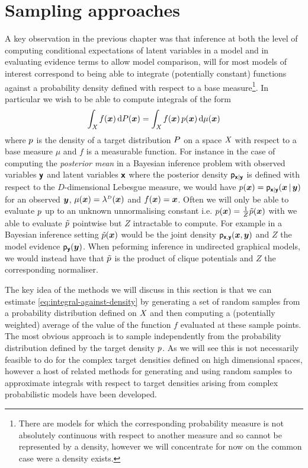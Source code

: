 \section{Sampling approaches}

A key observation in the previous chapter was that inference at both the level of computing conditional expectations of latent variables in a model and in evaluating evidence terms to allow model comparison, will for most models of interest correspond to being able to integrate (potentially constant) functions against a probability density defined with respect to a base measure\footnote{There are models for which the corresponding probability measure is not absolutely continuous with respect to another measure and so cannot be represented by a density, however we will concentrate for now on the common case were a density exists.}. In particular we wish to be able to compute integrals of the form
\begin{equation}\label{eq:integral-against-density}
  \int_{\mathit{X}} f(\boldsymbol{x}) \, \mathrm{d} P(\boldsymbol{x}) =
  \int_{\mathit{X}} f(\boldsymbol{x}) \, p(\boldsymbol{x}) \,\mathrm{d}\mu(\boldsymbol{x})
\end{equation}
where $p$ is the density of a target distribution $P$ on a space $\mathit{X}$ with respect to a base measure $\mu$ and $f$ is a measurable function. For instance in the case of computing the \emph{posterior mean} in a Bayesian inference problem with observed variables $\boldsymbol{\mathsf{y}}$ and latent variables $\boldsymbol{\mathsf{x}}$ where the posterior density $\mathsf{p}_{\boldsymbol{\mathsf{x}}|\boldsymbol{\mathsf{y}}}$ is defined with respect to the $D$-dimensional Lebesgue measure, we would have  $p(\boldsymbol{x}) = \mathsf{p}_{\boldsymbol{\mathsf{x}}|\boldsymbol{\mathsf{y}}}(\boldsymbol{x}\operatorname{|}\boldsymbol{y})$ for an observed $\boldsymbol{y}$, $\mu(\vct{x}) = \lebm{D}(\vct{x})$ and $f(\boldsymbol{x}) = \boldsymbol{x}$. Often we will only be able to evaluate $p$ up to an unknown unnormalising constant i.e. $p(\boldsymbol{x}) = \frac{1}{Z}\tilde{p}(\boldsymbol{x})$ with we able to evaluate $\tilde{p}$ pointwise but $Z$ intractable to compute. For example in a Bayesian inference setting $\tilde{p}(\boldsymbol{x})$ would be the joint density $\mathsf{p}_{\boldsymbol{\mathsf{x}},\boldsymbol{\mathsf{y}}}(\boldsymbol{x},\boldsymbol{y})$ and $Z$ the model evidence $\mathsf{p}_{\boldsymbol{\mathsf{y}}}(\boldsymbol{y})$. When peforming inference in undirected graphical models, we would instead have that $\tilde{p}$ is the product of clique potentials and $Z$ the corresponding normaliser.

The key idea of the methods we will discuss in this section is that we can estimate \eqref{eq:integral-against-density} by generating a set of random samples from a probability distribution defined on $\mathit{X}$ and then computing a (potentially weighted) average of the value of the function $f$ evaluated at these sample points. The most obvious approach is to sample independently from the probability distribution defined by the target density $p$. As we will see this is not necessarily feasible to do for the complex target densities defined on high dimensional spaces, however a host of related methods for generating and using random samples to approximate integrals with respect to target densities arising from complex probabilistic models have been developed.

